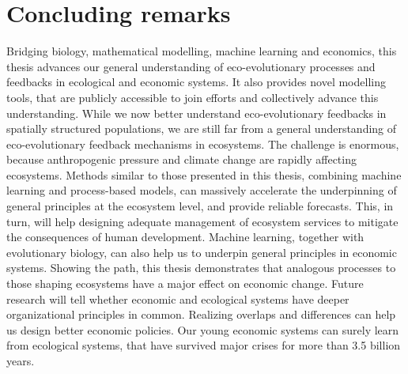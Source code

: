 % 



\section{Concluding remarks}


Bridging biology, mathematical modelling, machine learning and economics, this thesis advances our general understanding of eco-evolutionary processes and feedbacks in ecological and economic systems. It also provides novel modelling tools, that are publicly accessible to join efforts and collectively advance this understanding.
% 
While we now better understand eco-evolutionary feedbacks in spatially structured populations, we are still far from a general understanding of eco-evolutionary feedback mechanisms in ecosystems. 
% 
The challenge is enormous, because anthropogenic pressure and climate change are rapidly affecting ecosystems.
% 
Methods similar to those presented in this thesis, combining machine learning and process-based models, can massively accelerate the underpinning of general principles at the ecosystem level, and provide reliable forecasts. This, in turn, will help designing adequate management of ecosystem services to mitigate the consequences of human development.
% 
Machine learning, together with evolutionary biology, can also help us to underpin general principles in economic systems. Showing the path, this thesis demonstrates that analogous processes to those shaping ecosystems have a major effect on economic change. Future research will tell whether economic and ecological systems have deeper organizational principles in common.
% 
Realizing overlaps and differences can help us design better economic policies. 
% 
Our young economic systems can surely learn from ecological systems, that have survived major crises for more than 3.5 billion years.









% 


